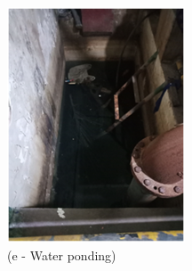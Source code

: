 \begin{figure}[!h]
\begin{minipage}[b]{0.22\linewidth}
		\includegraphics[width=\textwidth]{figures/fig_ch04_fdas_waterponding}
		\caption*{(e - Water ponding)}
	\end{minipage}
	\hspace{0.03cm}
	\begin{minipage}[b]{0.22\linewidth}

\end{minipage}
\end{figure}

